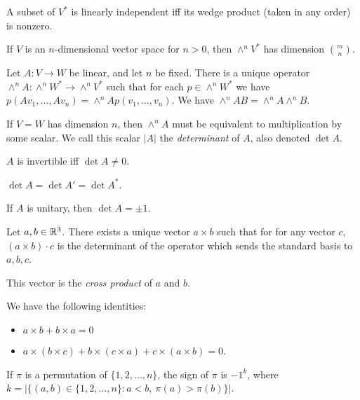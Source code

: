 \begin{prop}
    A subset of $V^*$ is linearly independent iff its wedge product (taken in any
    order) is nonzero.
\end{prop}
\begin{prop}
    If $V$ is an $n$-dimensional vector space for $n>0$, then $\wedge^n V^*$ has
    dimension $\binom mn$.
\end{prop}
\begin{prop}
    Let $A:V\to W$ be linear, and let $n$ be fixed. There is a unique operator
    $\wedge^n A:\wedge^n W^*\to\wedge^n V^*$ such that for each $p\in\wedge^n
    W^*$ we
    have $p(Av_1,\ldots,Av_n)=\wedge^n Ap(v_1,\ldots,v_n)$. We have $\wedge^n
    AB=\wedge^n A\wedge^n B$.
\end{prop}
\begin{defn}
    If $V=W$ has dimension $n$,
    then $\wedge^n A$ must be equivalent to multiplication by some scalar.
    We call this scalar $|A|$ the \emph{determinant} of $A$, also denoted $\det
    A$.
\end{defn}
\begin{prop}
  $A$ is invertible iff $\det A\ne 0$.
\end{prop}
\begin{prop}
    $\det A=\det A'=\det A^*$.
\end{prop}
\begin{cor}
    If $A$ is unitary, then $\det A=\pm 1$.
\end{cor}
\begin{prop}
    Let $a,b\in\mathbb{R}^3$. There exists a unique vector $a\times b$ such that for
    for any vector $c$, $(a\times b)\cdot c$ is the determinant of the operator
    which sends the standard basis to $a,b,c$.
\end{prop}
\begin{defn}
    This vector is the \emph{cross product} of $a$ and $b$.
\end{defn}
\begin{prop}
    We have the following identities:
    \begin{itemize}
        \item $a\times b+b\times a=0$
        \item $a\times(b\times c)+b\times(c\times a)+c\times(a\times b)=0$.
    \end{itemize}
\end{prop}
\begin{defn}
    If $\pi$ is a permutation of $\{1,2,\ldots,n\}$, the sign of $\pi$ is $-1^k$,
    where $k=|\{(a,b)\in\{1,2,\ldots,n\}:a<b,\ \pi(a)>\pi(b)\}|$.
\end{defn}
